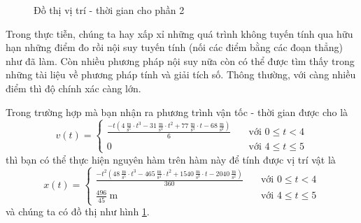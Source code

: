 \documentclass[a4paper, titlepage, openany]{book}
\begin{document}
\begin{figure}[h!]
   \centering
   \caption{Đồ thị vị trí - thời gian cho phần 2}
   \label{fig:vttgp2}
\end{figure}

Trong thực tiễn, chúng ta hay xấp xỉ những quá trình không tuyến tính qua hữu hạn những điểm đo rồi nội suy tuyến tính (nối các điểm bằng các đoạn thẳng) như đã làm. Còn nhiều phương pháp nội suy nữa còn có thể được tìm thấy trong những tài liệu về phương pháp tính và giải tích số. Thông thường, với càng nhiều điểm thì độ chính xác càng lớn.

Trong trường hợp mà bạn nhận ra phương trình vận tốc - thời gian được cho là
\begin{equation*}
   v(t) =
   \begin{cases}
      \displaystyle \frac{\displaystyle -t\left(4\ \frac{\text{m}}{\text{s}^5}\cdot t^3-31\ \frac{\text{m}}{\text{s}^4}\cdot t^2+77\ \frac{\text{m}}{\text{s}^3}\cdot t-68\ \frac{\text{m}}{\text{s}^2}\right)}{6} &\quad \text{với } 0 \leq t < 4 \\
      0&\quad \text{với } 4 \leq t \leq 5
   \end{cases}
\end{equation*}
thì bạn có thể thực hiện nguyên hàm trên hàm này để tính được vị trí vật là
\begin{equation*}
   \displaystyle 
   x(t) =
   \begin{cases}
      \displaystyle \frac{\displaystyle -t^2\left(48\ \frac{\text{m}}{\text{s}^5}\cdot t^3-465\ \frac{\text{m}}{\text{s}^4}\cdot t^2+1540\ \frac{\text{m}}{\text{s}^3}\cdot t-2040\ \frac{\text{m}}{\text{s}^2}\right)}{360} &\quad \text{với } 0 \leq t < 4 \\
      \displaystyle \frac{496}{45}\ \text{m}&\quad \text{với } 4 \leq t \leq 5
   \end{cases}
\end{equation*}
và chúng ta có đồ thị như hình \ref{fig:vttgp2}.
\end{document}
